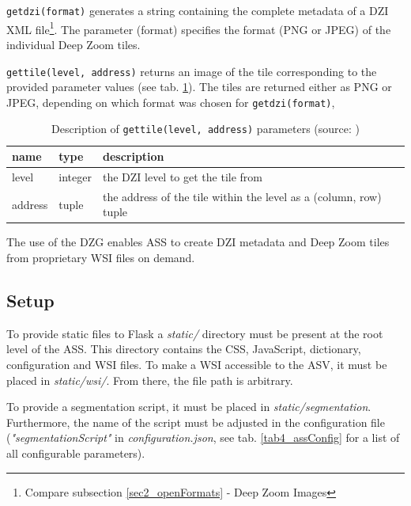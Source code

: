 \texttt{get{\textunderscore}dzi(format)} generates a string containing the complete metadata of a DZI XML file\footnote{
	Compare subsection \ref{sec2_openFormats} - Deep Zoom Images
}. The parameter (format) specifies the format (PNG or JPEG) of the individual Deep Zoom tiles.

\texttt{get{\textunderscore}tile(level, address)} returns an image of the tile corresponding to the provided parameter values (see tab. \ref{tab4_getTileParams}). The tiles are returned either as PNG or JPEG, depending on which format was chosen for \texttt{get{\textunderscore}dzi(format)}, 

\begin{table}[H]
	\begin{center}
		\begin{tabular}{| p{1.5cm} | p{1.5cm} | p{7cm} |}
			\hline
			\textbf{name} & \textbf{type} & \textbf{description}\\ \hline
			level & integer & the DZI level to get the tile from \\ \hline
			address & tuple & the address of the tile within the level as a (column, row) tuple\\ \hline
		\end{tabular}
		\caption{Description of \texttt{get{\textunderscore}tile(level, address)} parameters (source: \cite{web:openslide})}
		\label{tab4_getTileParams}
	\end{center}
\end{table}

The use of the DZG enables ASS to create DZI metadata and Deep Zoom tiles from proprietary WSI files on demand.


\subsection{Setup}
\label{sec4_setup}
To provide static files to Flask a \emph{static/} directory must be present at the root level of the ASS. This directory contains the CSS, JavaScript, dictionary, configuration and WSI files. To make a WSI accessible to the ASV, it must be placed in \emph{static/wsi/}. From there, the file path is arbitrary.

To provide a segmentation script, it must be placed in \emph{static/segmentation}. Furthermore, the name of the script must be adjusted in the configuration file (\emph{"segmentationScript"} in \emph{configuration.json}, see tab. \ref{tab4_assConfig} for a list of all configurable parameters). 

